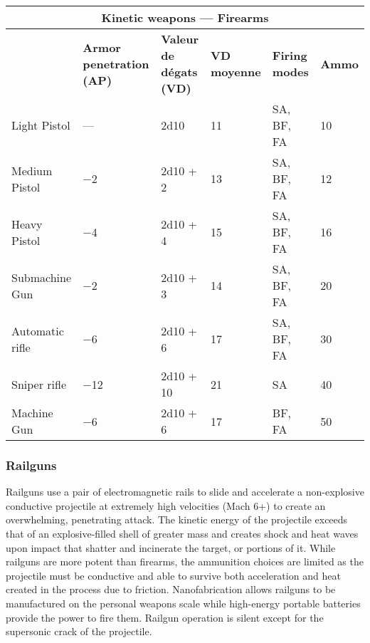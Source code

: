 \begin{table} \begin{tabularx}{\textwidth}{|l|X|X|X|l|l|} \hline

\multicolumn{6}{|c|}{\textbf{Kinetic weapons --- Firearms}} \\ \hline

&\textbf{Armor penetration (AP)}	&\textbf{Valeur de dégats (VD)}	&\textbf{VD moyenne}	&\textbf{Firing modes}	&\textbf{Ammo} \\ \hline

Light Pistol	&--- &2d10	&11	&SA, BF, FA	&10 \\ \hline

Medium Pistol	&$-$2	&2d10 + 2	&13	&SA, BF, FA	&12 \\ \hline

Heavy Pistol	&$-$4	&2d10 + 4	&15	&SA, BF, FA	&16 \\ \hline

Submachine Gun	&$-$2	&2d10 + 3	&14	&SA, BF, FA	&20 \\ \hline

Automatic rifle	&$-$6	&2d10 + 6	&17	&SA, BF, FA	&30 \\ \hline

Sniper rifle	&$-$12	&2d10 + 10	&21	&SA	&40 \\ \hline

Machine Gun	&$-$6	&2d10 + 6	&17	&BF, FA	&50 \\ \hline

\end{tabularx} \label{tab:kinetic-firearms} \end{table} 

\subsubsection{Railguns} 

Railguns use a pair of electromagnetic rails to slide and accelerate a non-explosive conductive projectile at extremely high velocities (Mach 6+) to create an overwhelming, penetrating attack. The kinetic energy of the projectile exceeds that of an explosive-filled shell of greater mass and creates shock and heat waves upon impact that shatter and incinerate the target, or portions of it. While railguns are more potent than firearms, the ammunition choices are limited as the projectile must be conductive and able to survive both acceleration and heat created in the process due to friction. Nanofabrication allows railguns to be manufactured on the personal weapons scale while high-energy portable batteries provide the power to fire them. Railgun operation is silent except for the supersonic crack of the projectile. 


